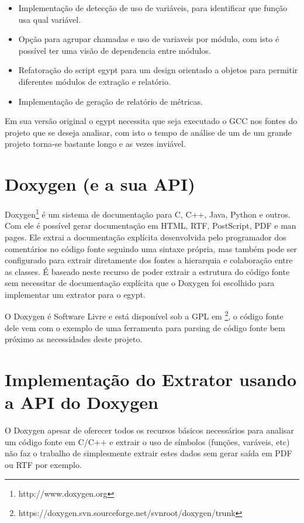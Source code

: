 \begin{itemize}
\item Implementação de detecção de uso de variáveis, para identificar que função usa qual variável.
\item Opção para agrupar chamadas e uso de variaveis por módulo, com isto é possível ter uma visão de dependencia entre módulos.
\item Refatoração do script egypt para um design orientado a objetos para permitir diferentes módulos de extração e relatório.
\item Implementação de geração de relatório de métricas.
\end{itemize}

Em sua versão original o egypt necessita que seja executado o GCC nos fontes do projeto que se deseja analisar, com isto o tempo de análise de um de um grande projeto torna-se bastante longo e as vezes inviável.

\section{Doxygen (e a sua API)}

Doxygen\footnote{http://www.doxygen.org} é um sistema de documentação para C, C++, Java, Python e outros. Com ele é possível gerar documentação em HTML, RTF, PostScript, PDF e man pages. Ele extrai a documentação explícita desenvolvida pelo programador dos comentários no código fonte seguindo uma sintaxe própria, mas também pode ser configurado para extrair diretamente dos fontes a hierarquia e colaboração entre as classes. É baseado neste recurso de poder extrair a estrutura do código fonte sem necessitar de documentação explícita que o Doxygen foi escolhido para implementar um extrator para o egypt.

O Doxygen é Software Livre e está disponível sob a GPL  em \footnote{https://doxygen.svn.sourceforge.net/svnroot/doxygen/trunk}, o código fonte dele vem com o exemplo de uma ferramenta para parsing de código fonte bem próximo as necessidades deste projeto.

\section{Implementação do Extrator usando a API do Doxygen}

O Doxygen apesar de oferecer todos os recursos básicos necessários para analisar um código fonte em C/C++ e extrair o uso de símbolos (funções, varáveis, etc) não faz o trabalho de simplesmente extrair estes dados sem gerar saída em PDF ou RTF por exemplo.

